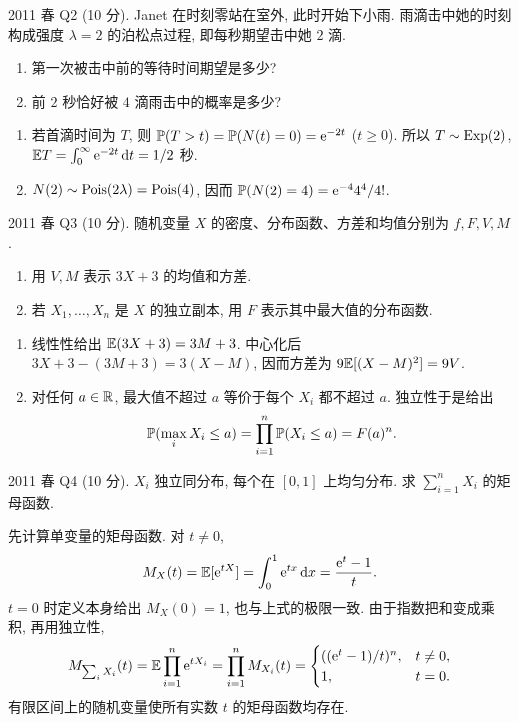 \begin{exercise}\label{ex:fe2011q2}
2011 春 Q2 (10 分). Janet 在时刻零站在室外, 此时开始下小雨. 雨滴击中她的时刻构成强度 $\lambda=2$ 的泊松点过程, 即每秒期望击中她 $2$ 滴.
\begin{enumerate}[label=(\alph*)]
\item\label{ex:fe2011q2-a} 第一次被击中前的等待时间期望是多少?
\item\label{ex:fe2011q2-b} 前 $2$ 秒恰好被 $4$ 滴雨击中的概率是多少?
\end{enumerate}
\end{exercise}
\begin{solution}
\begin{enumerate}[label=(\alph*)]
\item\label{sol:fe2011q2-a} 若首滴时间为 $T$, 则 $\mathbb P(T>t)=\mathbb P(N(t)=0)=\mathrm e^{-2t}$ ($t\ge0$). 所以 $T\sim\operatorname{Exp}(2)$, $\mathbb E T=\int_0^\infty\mathrm e^{-2t}\,\mathrm d t=1/2$ 秒.
\item\label{sol:fe2011q2-b} $N(2)\sim\operatorname{Pois}(2\lambda)=\operatorname{Pois}(4)$, 因而 $\mathbb P(N(2)=4)=\mathrm e^{-4}4^4/4!$.
\end{enumerate}
\end{solution}

\begin{exercise}\label{ex:fe2011q3}
2011 春 Q3 (10 分). 随机变量 $X$ 的密度、分布函数、方差和均值分别为 $f,F,V,M$.
\begin{enumerate}[label=(\alph*)]
\item\label{ex:fe2011q3-a} 用 $V,M$ 表示 $3X+3$ 的均值和方差.
\item\label{ex:fe2011q3-b} 若 $X_1,\ldots,X_n$ 是 $X$ 的独立副本, 用 $F$ 表示其中最大值的分布函数.
\end{enumerate}
\end{exercise}
\begin{solution}
\begin{enumerate}[label=(\alph*)]
\item\label{sol:fe2011q3-a} 线性性给出 $\mathbb E(3X+3)=3M+3$. 中心化后 $3X+3-(3M+3)=3(X-M)$, 因而方差为 $9\mathbb E[(X-M)^2]=9V$.
\item\label{sol:fe2011q3-b} 对任何 $a\in\mathbb R$, 最大值不超过 $a$ 等价于每个 $X_i$ 都不超过 $a$. 独立性于是给出
\[
 \mathbb P(\max_iX_i\le a)=\prod_{i=1}^n\mathbb P(X_i\le a)=F(a)^n.
\]
\end{enumerate}
\end{solution}

\begin{exercise}\label{ex:fe2011q4}\label{ex:fe2011q4-root}
2011 春 Q4 (10 分). $X_i$ 独立同分布, 每个在 $[0,1]$ 上均匀分布. 求 $\sum_{i=1}^nX_i$ 的矩母函数.
\end{exercise}
\begin{solution}\label{sol:fe2011q4-root}
先计算单变量的矩母函数. 对 $t\ne0$,
\[
 M_X(t)=\mathbb E[\mathrm e^{tX}]=\int_0^1\mathrm e^{tx}\,\mathrm d x=\frac{\mathrm e^t-1}{t}.
\]
$t=0$ 时定义本身给出 $M_X(0)=1$, 也与上式的极限一致. 由于指数把和变成乘积, 再用独立性,
\[
 M_{\sum_iX_i}(t)=\mathbb E\prod_{i=1}^n\mathrm e^{tX_i}
 =\prod_{i=1}^n M_{X_i}(t)
 =\begin{cases}((\mathrm e^t-1)/t)^n,&t\ne0,\\1,&t=0.\end{cases}
\]
有限区间上的随机变量使所有实数 $t$ 的矩母函数均存在.
\end{solution}

